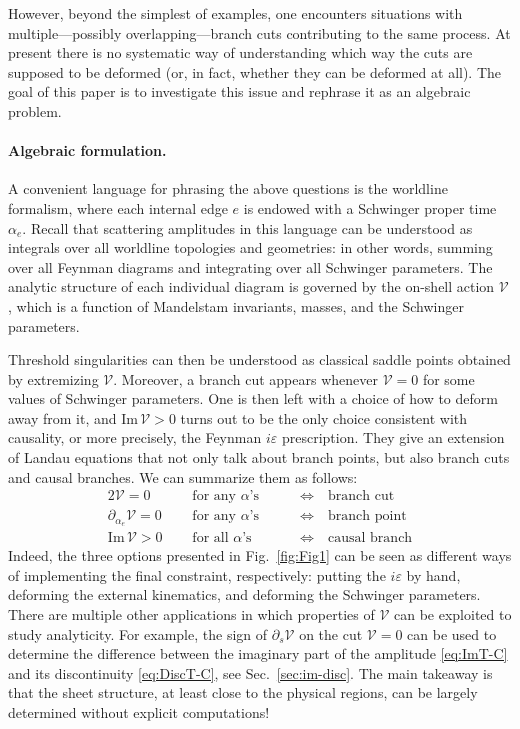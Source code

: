 \documentclass[12pt]{article}
\numberwithin{figure}{section}
\def \eps {\varepsilon}
\def \V {\mathcal{V}}
\def \Im {\mathrm{Im}}
\begin{document}
	However, beyond the simplest of examples, one encounters situations with multiple---possibly overlapping---branch cuts contributing to the same process. At present there is no systematic way of understanding which way the cuts are supposed to be deformed (or, in fact, whether they can be deformed at all). The goal of this paper is to investigate this issue and rephrase it as an algebraic problem.
	
	\paragraph{Algebraic formulation.}
	A convenient language for phrasing the above questions is the worldline formalism, where each internal edge $e$ is endowed with a Schwinger proper time $\alpha_e$. Recall that scattering amplitudes in this language can be understood as integrals over all worldline topologies and geometries: in other words, summing over all Feynman diagrams and integrating over all Schwinger parameters. The analytic structure of each individual diagram is governed by the on-shell action $\V$, which is a function of Mandelstam invariants, masses, and the Schwinger parameters.
	
	Threshold singularities can then be understood as classical saddle points obtained by extremizing $\V$. Moreover, a branch cut appears whenever $\V=0$ for some values of Schwinger parameters. One is then left with a choice of how to deform away from it, and $\Im\, \V > 0$ turns out to be the only choice consistent with causality, or more precisely, the Feynman $i\eps$ prescription. They give an extension of Landau equations \cite{Bjorken:1959fd,Landau:1959fi,10.1143/PTP.22.128} that not only talk about branch points, but also branch cuts and causal branches. We can summarize them as follows:
    \begin{alignat}{2}
    \V = 0 \quad&\text{ for any $\alpha$'s } \quad&&\Leftrightarrow\quad \text{branch cut}\\
    \partial_{\alpha_e}\V = 0 \quad&\text{ for any $\alpha$'s } \quad&&\Leftrightarrow\quad \text{branch point}\\
    \Im\,\V > 0 \quad&\text{ for all $\alpha$'s} \quad&&\Leftrightarrow\quad \text{causal branch}
    \end{alignat}
    Indeed, the three options presented in Fig.~\ref{fig:Fig1} can be seen as different ways of implementing the final constraint, respectively: putting the $i\eps$ by hand, deforming the external kinematics, and deforming the Schwinger parameters.
    There are multiple other applications in which properties of $\V$ can be exploited to study analyticity. For example, the sign of $\partial_s \V$ on the cut $\V=0$ can be used to determine the difference between the imaginary part of the amplitude \eqref{eq:ImT-C} and its discontinuity \eqref{eq:DiscT-C}, see Sec.~\ref{sec:im-disc}.
	The main takeaway is that the sheet structure, at least close to the physical regions, can be largely determined without explicit computations! 
	
\end{document}
